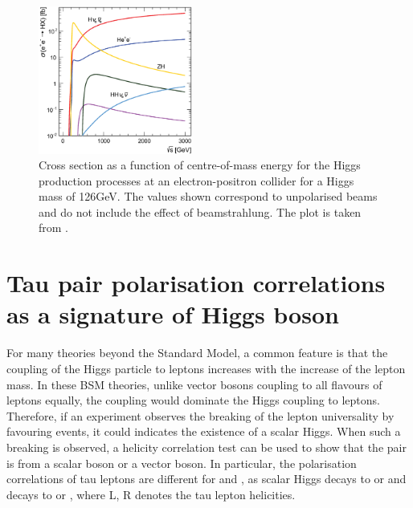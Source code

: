 \begin{figure}[!htbp]
\centering
\includegraphics[width=0.45\textwidth]{theory/HiggsCLICcrossSection}
\caption[]
{Cross section as a function of centre-of-mass energy for the Higgs production processes at an electron-positron collider for a Higgs mass of 126GeV. The values shown correspond
to unpolarised beams and do not include the effect of beamstrahlung. The plot is taken from \cite{Abramowicz:2016zbo}.}
\label{fig:theoryHiggsCrossSection}
\end{figure}


\section{Tau pair polarisation correlations as a signature of Higgs boson}
\label{sec:theoryTauPair}
For many theories beyond the Standard Model, a common feature is that the coupling of the Higgs particle to leptons increases with the increase of the lepton mass.  In these BSM theories, unlike vector bosons coupling to all flavours of leptons equally, the \HigssTauTau coupling would dominate the Higgs coupling to leptons. Therefore, if an experiment observes the breaking of the lepton universality by favouring \TauTau events, it could indicates the existence of a scalar Higgs. When such a breaking is observed, a helicity correlation test can be used to show that the \TauTau pair is from a scalar boson or a vector boson. In particular, the polarisation correlations of tau leptons are different for \HiggsToTauTau and \ZToTauTau, as scalar Higgs decays to  or  and \PZ decays to  or , where L, R denotes the tau lepton helicities.


